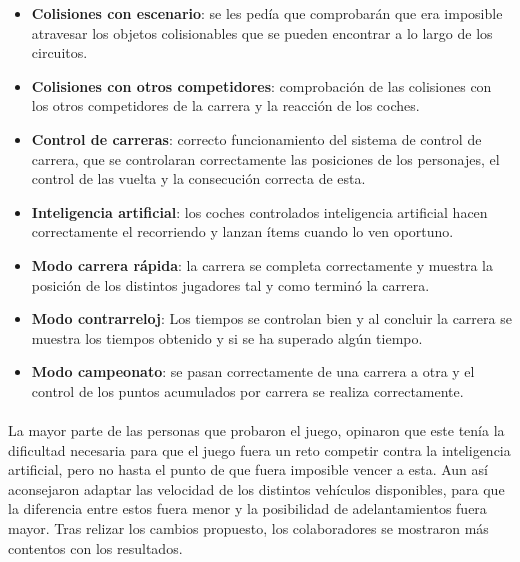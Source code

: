 \begin{itemize}
    \item \textbf{Colisiones con escenario}: se les pedía que comprobarán que era imposible atravesar los objetos colisionables
    que se pueden encontrar a lo largo de los circuitos.
    
    \item \textbf{Colisiones con otros competidores}: comprobación de las colisiones con los otros competidores de la carrera y la
    reacción de los coches.
    
    \item \textbf{Control de carreras}: correcto funcionamiento del sistema de control de carrera, que se controlaran 
    correctamente las posiciones de los personajes, el control de las vuelta y la consecución correcta de esta.
    
    \item \textbf{Inteligencia artificial}: los coches controlados inteligencia artificial hacen correctamente el recorriendo y 
    lanzan ítems cuando lo ven oportuno.
    
    \item \textbf{Modo carrera rápida}: la carrera se completa correctamente y muestra la posición de los distintos jugadores tal 
    y como terminó la carrera.
    
    \item \textbf{Modo contrarreloj}: Los tiempos se controlan bien y al concluir la carrera se muestra los tiempos obtenido y si se
    ha superado algún tiempo.
    
    \item \textbf{Modo campeonato}: se pasan correctamente de una carrera a otra y el control de los puntos acumulados por carrera
    se realiza correctamente.
\end{itemize}

\paragraph{}
La mayor parte de las personas que probaron el juego, opinaron que este tenía la dificultad necesaria para que el juego fuera un 
reto competir contra la inteligencia artificial, pero no hasta el punto de que fuera imposible vencer a esta. Aun así aconsejaron
adaptar las velocidad de los distintos vehículos disponibles, para que la diferencia entre estos fuera menor y la posibilidad
de adelantamientos fuera mayor. Tras relizar los cambios propuesto, los colaboradores se mostraron más contentos con los resultados.

